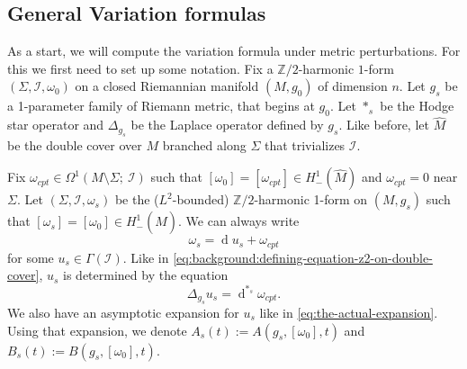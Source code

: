 \documentclass[11pt]{amsart}
\newcommand{\ZT}{\mathbb{Z}/2}
\renewcommand{\d}{\operatorname{d}}
\begin{document}
\subsection{General Variation formulas}
As a start, we will compute the variation formula under metric perturbations.
For this we first need to set up some notation.
Fix a $\mathbb Z/2$-harmonic $1$-form $(\Sigma,\mathcal I,\omega_0)$ on a closed Riemannian manifold $(M,g_0)$ of dimension $n$. 
Let $g_s$ be a 1-parameter family of Riemann metric, that begins at $g_0$. 
Let $*_s$ be the Hodge star operator and $\Delta_{g_s}$ be the Laplace operator defined by $g_s$. Like before, let $\widehat{M}$ be the double cover over $M$ branched along $\Sigma$ that trivializes $\mathcal{I}$.

Fix $\omega_{cpt} \in \Omega^1(M \setminus \Sigma; \: \mathcal{I})$ such that $[\omega_0] = [\omega_{cpt}] \in H^1_-(\widehat{M})$ and $\omega_{cpt} = 0$ near $\Sigma$. 
Let $(\Sigma,\mathcal I,\omega_s)$ be the ($L^2$-bounded) $\ZT$-harmonic 1-form on $(M, g_s)$ such that $[\omega_s] = [\omega_{0}] \in H^1_-(\widehat{M})$. 
We can always write
$$
\omega_s = \d u_s + \omega_{cpt}
$$
for some $u_s \in \Gamma(\mathcal{I})$. Like in \eqref{eq:background:defining-equation-z2-on-double-cover},
$u_s$ is determined by the equation
\begin{equation}
	\label{eq_u_s}
	\Delta_{g_s} u_s=\d^{*_{s}}\omega_{cpt}.
\end{equation}
We also have an asymptotic expansion for $u_s$ like in \eqref{eq:the-actual-expansion}. Using that expansion, we denote $A_s(t) := A(g_s, [\omega_0], t)$ and $B_s(t) := B(g_s, [\omega_0], t)$.
\end{document}
